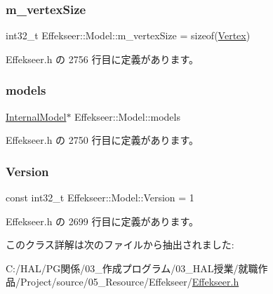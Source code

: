 \subsubsection{\texorpdfstring{m\+\_\+vertex\+Size}{m\_vertexSize}}
{\footnotesize\ttfamily int32\+\_\+t Effekseer\+::\+Model\+::m\+\_\+vertex\+Size = sizeof(\mbox{\hyperlink{struct_effekseer_1_1_model_1_1_vertex}{Vertex}})\hspace{0.3cm}{\ttfamily [protected]}}



 Effekseer.\+h の 2756 行目に定義があります。

\mbox{\label{class_effekseer_1_1_model_a59187b8fbbf43644cbbd782f7b2eea92}} 
\subsubsection{\texorpdfstring{models}{models}}
{\footnotesize\ttfamily \mbox{\hyperlink{struct_effekseer_1_1_model_1_1_internal_model}{Internal\+Model}}$\ast$ Effekseer\+::\+Model\+::models\hspace{0.3cm}{\ttfamily [private]}}



 Effekseer.\+h の 2750 行目に定義があります。

\mbox{\label{class_effekseer_1_1_model_a9f5c2f10fde65efeb5bc603ed9d6436e}} 
\subsubsection{\texorpdfstring{Version}{Version}}
{\footnotesize\ttfamily const int32\+\_\+t Effekseer\+::\+Model\+::\+Version = 1\hspace{0.3cm}{\ttfamily [static]}}



 Effekseer.\+h の 2699 行目に定義があります。



このクラス詳解は次のファイルから抽出されました\+:\begin{DoxyCompactItemize}
\item 
C\+:/\+H\+A\+L/\+P\+G関係/03\+\_\+作成プログラム/03\+\_\+\+H\+A\+L授業/就職作品/\+Project/source/05\+\_\+\+Resource/\+Effekseer/\mbox{\hyperlink{_effekseer_8h}{Effekseer.\+h}}\end{DoxyCompactItemize}
